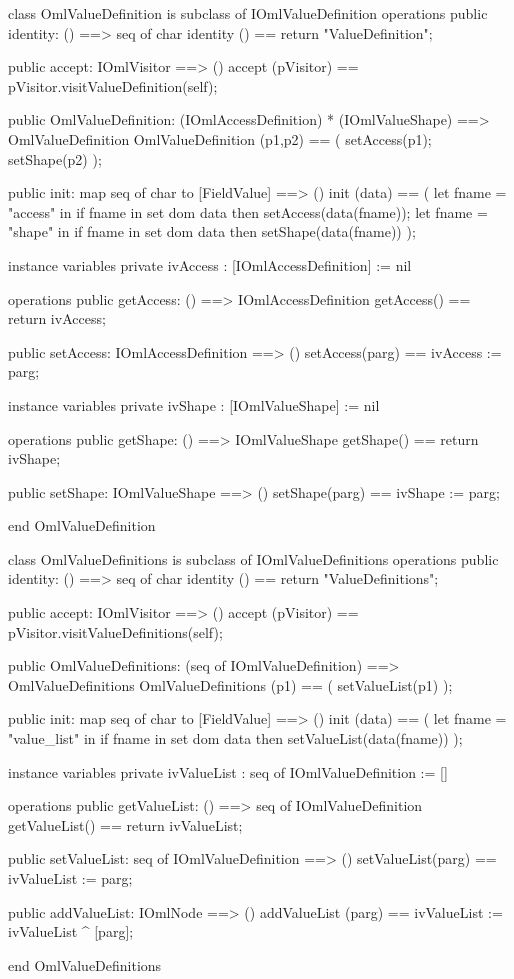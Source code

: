 \begin{vdm_al}
class OmlValueDefinition is subclass of IOmlValueDefinition
operations
  public identity: () ==> seq of char
  identity () == return "ValueDefinition";

  public accept: IOmlVisitor ==> ()
  accept (pVisitor) == pVisitor.visitValueDefinition(self);

  public OmlValueDefinition:
      (IOmlAccessDefinition) *
      (IOmlValueShape) ==> OmlValueDefinition
  OmlValueDefinition (p1,p2) == 
   ( setAccess(p1);
     setShape(p2) );

  public init: map seq of char to [FieldValue] ==> ()
  init (data) ==
    ( let fname = "access" in
        if fname in set dom data
        then setAccess(data(fname));
      let fname = "shape" in
        if fname in set dom data
        then setShape(data(fname)) );

instance variables
  private ivAccess : [IOmlAccessDefinition] := nil

operations
  public getAccess: () ==> IOmlAccessDefinition
  getAccess() == return ivAccess;

  public setAccess: IOmlAccessDefinition ==> ()
  setAccess(parg) == ivAccess := parg;

instance variables
  private ivShape : [IOmlValueShape] := nil

operations
  public getShape: () ==> IOmlValueShape
  getShape() == return ivShape;

  public setShape: IOmlValueShape ==> ()
  setShape(parg) == ivShape := parg;

end OmlValueDefinition
\end{vdm_al}

\begin{vdm_al}
class OmlValueDefinitions is subclass of IOmlValueDefinitions
operations
  public identity: () ==> seq of char
  identity () == return "ValueDefinitions";

  public accept: IOmlVisitor ==> ()
  accept (pVisitor) == pVisitor.visitValueDefinitions(self);

  public OmlValueDefinitions:
      (seq of IOmlValueDefinition) ==> OmlValueDefinitions
  OmlValueDefinitions (p1) == 
   ( setValueList(p1) );

  public init: map seq of char to [FieldValue] ==> ()
  init (data) ==
    ( let fname = "value_list" in
        if fname in set dom data
        then setValueList(data(fname)) );

instance variables
  private ivValueList : seq of IOmlValueDefinition := []

operations
  public getValueList: () ==> seq of IOmlValueDefinition
  getValueList() == return ivValueList;

  public setValueList: seq of IOmlValueDefinition ==> ()
  setValueList(parg) == ivValueList := parg;

  public addValueList: IOmlNode ==> ()
  addValueList (parg) == ivValueList := ivValueList ^ [parg];

end OmlValueDefinitions
\end{vdm_al}

